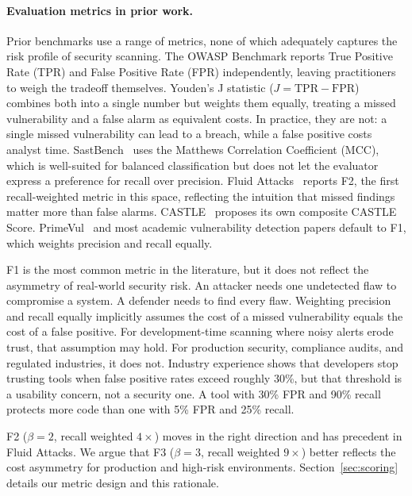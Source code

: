 \paragraph{Evaluation metrics in prior work.}
Prior benchmarks use a range of metrics, none of which adequately captures the risk profile of security scanning. The OWASP Benchmark reports True Positive Rate (TPR) and False Positive Rate (FPR) independently, leaving practitioners to weigh the tradeoff themselves. Youden's J statistic ($J = \text{TPR} - \text{FPR}$) combines both into a single number but weights them equally, treating a missed vulnerability and a false alarm as equivalent costs. In practice, they are not: a single missed vulnerability can lead to a breach, while a false positive costs analyst time. SastBench~\cite{feiglin2026sastbench} uses the Matthews Correlation Coefficient (MCC), which is well-suited for balanced classification but does not let the evaluator express a preference for recall over precision. Fluid Attacks~\cite{fluidattacks2025} reports F2, the first recall-weighted metric in this space, reflecting the intuition that missed findings matter more than false alarms. CASTLE~\cite{dubniczky2025castle} proposes its own composite CASTLE Score. PrimeVul~\cite{ding2024primevul} and most academic vulnerability detection papers default to F1, which weights precision and recall equally.

F1 is the most common metric in the literature, but it does not reflect the asymmetry of real-world security risk. An attacker needs one undetected flaw to compromise a system. A defender needs to find every flaw. Weighting precision and recall equally implicitly assumes the cost of a missed vulnerability equals the cost of a false positive. For development-time scanning where noisy alerts erode trust, that assumption may hold. For production security, compliance audits, and regulated industries, it does not. Industry experience shows that developers stop trusting tools when false positive rates exceed roughly 30\%, but that threshold is a usability concern, not a security one. A tool with 30\% FPR and 90\% recall protects more code than one with 5\% FPR and 25\% recall.

F2 ($\beta{=}2$, recall weighted $4\times$) moves in the right direction and has precedent in Fluid Attacks. We argue that F3 ($\beta{=}3$, recall weighted $9\times$) better reflects the cost asymmetry for production and high-risk environments. Section~\ref{sec:scoring} details our metric design and this rationale.

